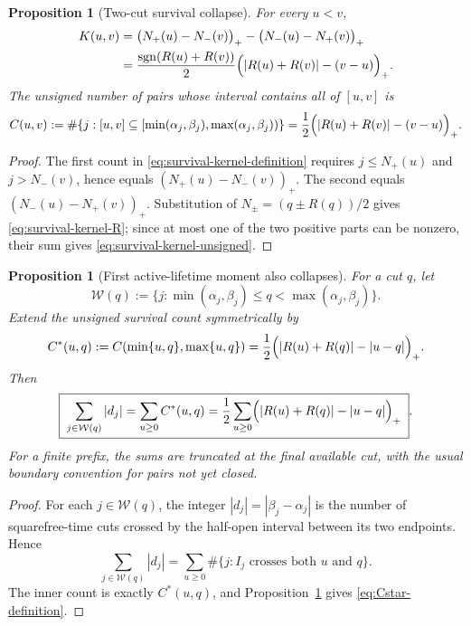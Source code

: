 \documentclass[11pt]{amsart}
\numberwithin{equation}{section}
\theoremstyle{plain}
\newtheorem{proposition}[theorem]{Proposition}
\theoremstyle{definition}
\theoremstyle{remark}
\begin{document}
\begin{proposition}[Two-cut survival collapse]
\label{prop:survival-kernel-collapse}
For every $u<v$,
\begin{align}
K(u,v)
&=\bigl(N_+(u)-N_-(v)\bigr)_+
 -\bigl(N_-(u)-N_+(v)\bigr)_+
\label{eq:survival-kernel-counters}\\
&=\frac{\operatorname{sgn}(R(u)+R(v))}{2}
\Bigl(|R(u)+R(v)|-(v-u)\Bigr)_+.
\label{eq:survival-kernel-R}
\end{align}
The unsigned number of pairs whose interval contains all of $[u,v]$ is
\begin{equation}
\label{eq:survival-kernel-unsigned}
C(u,v):=\#\{j:[u,v]\subseteq
[\min(\alpha_j,\beta_j),\max(\alpha_j,\beta_j))\}
=\frac12\Bigl(|R(u)+R(v)|-(v-u)\Bigr)_+.
\end{equation}
\end{proposition}

\begin{proof}
The first count in \eqref{eq:survival-kernel-definition} requires
$j\le N_+(u)$ and $j>N_-(v)$, hence equals
$(N_+(u)-N_-(v))_+$.  The second equals
$(N_-(u)-N_+(v))_+$.  Substitution of
$N_\pm=(q\pm R(q))/2$ gives \eqref{eq:survival-kernel-R}; since at most one
of the two positive parts can be nonzero, their sum gives
\eqref{eq:survival-kernel-unsigned}.
\end{proof}

\begin{proposition}[First active-lifetime moment also collapses]
\label{prop:active-lifetime-first-moment}
For a cut $q$, let
\begin{equation}
\label{eq:active-cut-set}
\mathcal W(q):=\{j:\min(\alpha_j,\beta_j)\le q<\max(\alpha_j,\beta_j)\}.
\end{equation}
Extend the unsigned survival count symmetrically by
\begin{equation}
\label{eq:Cstar-definition}
C^*(u,q):=C(\min\{u,q\},\max\{u,q\})
=\frac12\Bigl(|R(u)+R(q)|-|u-q|\Bigr)_+.
\end{equation}
Then
\begin{equation}
\label{eq:active-first-moment-collapse}
\boxed{\;
\sum_{j\in\mathcal W(q)}|d_j|
=\sum_{u\ge0} C^*(u,q)
=\frac12\sum_{u\ge0}
\Bigl(|R(u)+R(q)|-|u-q|\Bigr)_+
\;}.
\end{equation}
For a finite prefix, the sums are truncated at the final available cut, with the
usual boundary convention for pairs not yet closed.
\end{proposition}

\begin{proof}
For each $j\in\mathcal W(q)$, the integer $|d_j|=|\beta_j-\alpha_j|$ is the
number of squarefree-time cuts crossed by the half-open interval between its two
endpoints.  Hence
\begin{equation}
\label{eq:active-first-moment-double-count}
\sum_{j\in\mathcal W(q)}|d_j|
=\sum_{u\ge0}\#\{j:\text{$I_j$ crosses both $u$ and $q$}\}.
\end{equation}
The inner count is exactly $C^*(u,q)$, and
Proposition~\ref{prop:survival-kernel-collapse} gives
\eqref{eq:Cstar-definition}.
\end{proof}
\end{document}
